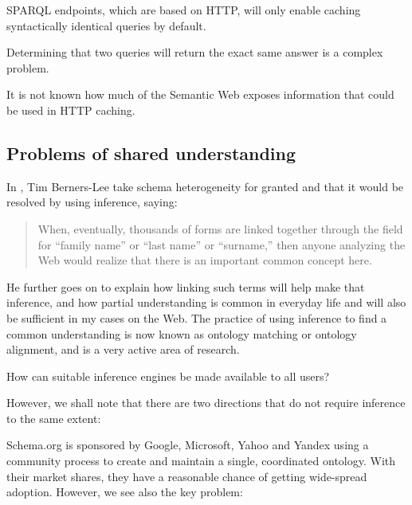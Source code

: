 \begin{problem}\label{prob:syntacticcache}
SPARQL endpoints, which are based on HTTP, will only enable caching
syntactically identical queries by  default.
\end{problem}

\begin{problem}\label{prob:queryeq}
Determining that two queries will return the exact same answer is a
complex problem.
\end{problem}

\begin{problem}\label{prob:sanity}
It is not known how much of the Semantic Web exposes information that
could be used in HTTP caching.
\end{problem}


\subsection{Problems of shared understanding}\label{sec:semproblems}

In \cite{berners2000weaving}, Tim Berners-Lee take schema
heterogeneity for granted and that it would be resolved by using
inference, saying:

\begin{quote}
When, eventually, thousands of forms are linked together through the
field for ``family name'' or ``last name'' or ``surname,'' then anyone
analyzing the Web would realize that there is an important common
concept here.
\end{quote}

He further goes on to explain how linking such terms will help make
that inference, and how partial understanding is common in everyday
life and will also be sufficient in my cases on the Web. The practice
of using inference to find a common understanding is now known as
ontology matching or ontology alignment, and is a very active area of
research.


\begin{problem}\label{prob:infgivecode}
How can suitable inference engines be made available to all users?
\end{problem}


However, we shall note that there are two directions that do not
require inference to the same extent: 

Schema.org is sponsored by Google, Microsoft, Yahoo and Yandex using a
community process to create and maintain a single, coordinated
ontology. With their market shares, they have a reasonable chance of
getting wide-spread adoption. However, we see also the key problem:

